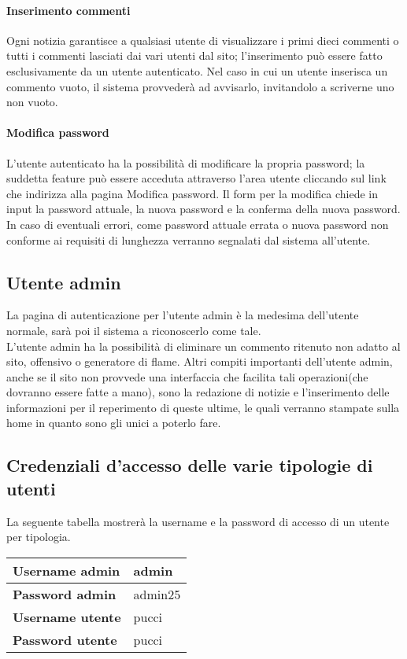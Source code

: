 \paragraph{Inserimento commenti}
Ogni notizia garantisce a qualsiasi utente di visualizzare i primi dieci commenti o tutti i commenti lasciati dai vari utenti dal sito; l'inserimento può essere fatto esclusivamente da un utente autenticato. Nel caso in cui un utente inserisca un commento vuoto, il sistema provvederà ad avvisarlo, invitandolo a scriverne uno non vuoto.
\paragraph{Modifica password}
L'utente autenticato ha la possibilità di modificare la propria password; la suddetta feature può essere acceduta attraverso l'area utente cliccando sul link che indirizza alla pagina Modifica password. Il form per la modifica chiede in input la password attuale, la nuova password e la conferma della nuova password. In caso di eventuali errori, come password attuale errata o nuova password non conforme ai requisiti di lunghezza verranno segnalati dal sistema all'utente.

\subsection{Utente admin}
La pagina di autenticazione per l'utente admin è la medesima dell'utente normale, sarà poi il sistema a riconoscerlo come tale.\\
L'utente admin ha la possibilità di eliminare un commento ritenuto non adatto al sito, offensivo o generatore di flame.
Altri compiti importanti dell'utente admin, anche se il sito non provvede una interfaccia che facilita tali operazioni(che dovranno essere fatte a mano), sono la redazione di notizie e l'inserimento delle informazioni per il reperimento di queste ultime, le quali verranno stampate sulla home in quanto sono gli unici a poterlo fare.
\subsection{Credenziali d'accesso delle varie tipologie di utenti}
La seguente tabella mostrerà la username e la password di accesso di un utente per tipologia.
\begin{small}
\begin{longtable}{|p{5.25cm}|p{5.25cm}|}
\hline
\textbf{Username admin} & admin \\
\hline
\textbf{Password admin} & admin25 \\
\hline
\textbf{Username utente} & pucci \\
\hline
\textbf{Password utente} & pucci \\
\hline
\end{longtable}
\end{small}